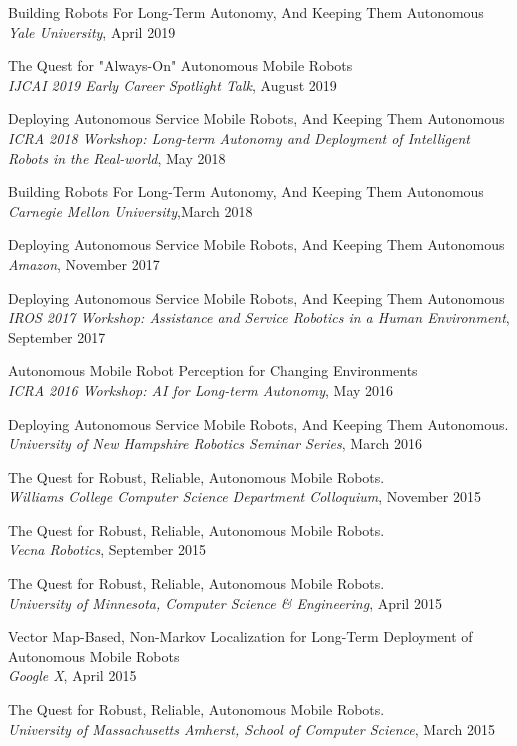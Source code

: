 \documentclass[Times]{article}
\begin{document}
Building Robots For Long-Term Autonomy, And Keeping Them Autonomous\\
{\em Yale University}, April 2019

The Quest for "Always-On" Autonomous Mobile Robots\\
{\em IJCAI 2019 Early Career Spotlight Talk}, August 2019

Deploying Autonomous Service Mobile Robots, And Keeping Them Autonomous\\
{\em ICRA 2018 Workshop: Long-term Autonomy and Deployment of Intelligent Robots
in the Real-world}, May 2018

Building Robots For Long-Term Autonomy, And Keeping Them Autonomous\\
{\em Carnegie Mellon University},March 2018

Deploying Autonomous Service Mobile Robots, And Keeping Them Autonomous\\
{\em Amazon}, November 2017

Deploying Autonomous Service Mobile Robots, And Keeping Them Autonomous\\
{\em IROS 2017 Workshop: Assistance and Service Robotics in a Human
Environment}, September 2017

Autonomous Mobile Robot Perception for Changing Environments\\
{\em ICRA 2016 Workshop: AI for Long-term Autonomy}, May 2016

Deploying Autonomous Service Mobile Robots, And Keeping Them Autonomous.\\
{\em University of New Hampshire Robotics Seminar Series}, March 2016

The Quest for Robust, Reliable, Autonomous Mobile Robots.\\
{\em Williams College Computer Science Department Colloquium}, November 2015

The Quest for Robust, Reliable, Autonomous Mobile Robots.\\
{\em Vecna Robotics}, September 2015

The Quest for Robust, Reliable, Autonomous Mobile Robots.\\
{\em University of Minnesota, Computer Science \& Engineering}, April 2015

Vector Map-Based, Non-Markov Localization for Long-Term Deployment of Autonomous Mobile Robots\\
{\em Google X}, April 2015

The Quest for Robust, Reliable, Autonomous Mobile Robots.\\
{\em University of Massachusetts Amherst, School of Computer Science}, March 2015
\end{document}
